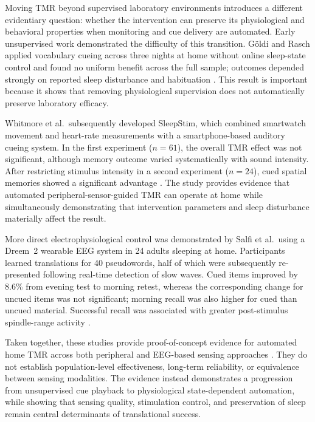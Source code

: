 Moving TMR beyond supervised laboratory environments introduces a different
evidentiary question: whether the intervention can preserve its physiological
and behavioral properties when monitoring and cue delivery are automated.
Early unsupervised work demonstrated the difficulty of this transition.
G{\"o}ldi and Rasch applied vocabulary cueing across three nights at home without
online sleep-state control and found no uniform benefit across the full sample;
outcomes depended strongly on reported sleep disturbance and habituation
\citep{goldi2019home}. This result is important because it shows that removing
physiological supervision does not automatically preserve laboratory efficacy.

Whitmore et al.\ subsequently developed SleepStim, which combined smartwatch
movement and heart-rate measurements with a smartphone-based auditory cueing
system. In the first experiment (\(n=61\)), the overall TMR effect was not
significant, although memory outcome varied systematically with sound intensity.
After restricting stimulus intensity in a second experiment (\(n=24\)), cued
spatial memories showed a significant advantage
\citep{whitmore2022improving}. The study provides evidence that automated
peripheral-sensor-guided TMR can operate at home while simultaneously
demonstrating that intervention parameters and sleep disturbance materially
affect the result.

More direct electrophysiological control was demonstrated by Salfi et al.\ using
a Dreem~2 wearable EEG system in 24 adults sleeping at home. Participants
learned translations for 40 pseudowords, half of which were subsequently
re-presented following real-time detection of slow waves. Cued items improved
by 8.6\% from evening test to morning retest, whereas the corresponding change
for uncued items was not significant; morning recall was also higher for cued
than uncued material. Successful recall was associated with greater
post-stimulus spindle-range activity
\citep{salfi2025promoting}.

Taken together, these studies provide proof-of-concept evidence for automated
home TMR across both peripheral and EEG-based sensing approaches
\citep{goldi2019home,whitmore2022improving,salfi2025promoting}. They do not
establish population-level effectiveness, long-term reliability, or equivalence
between sensing modalities. The evidence instead demonstrates a progression
from unsupervised cue playback to physiological state-dependent automation,
while showing that sensing quality, stimulation control, and preservation of
sleep remain central determinants of translational success.


